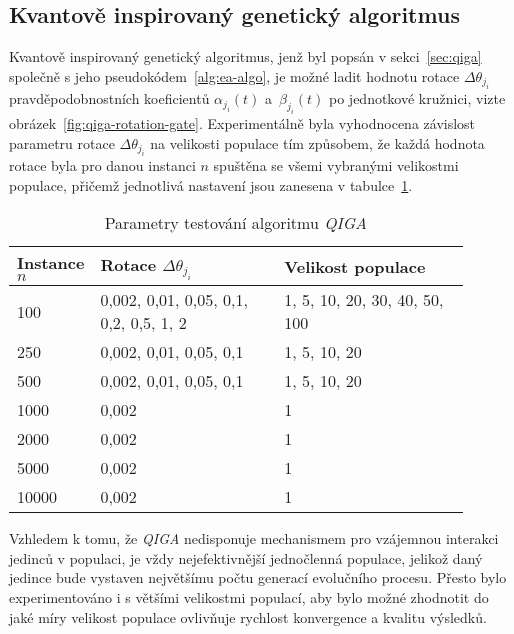 \subsection*{Kvantově inspirovaný genetický algoritmus}
Kvantově inspirovaný genetický algoritmus, jenž byl popsán v sekci~\ref{sec:qiga} společně s jeho pseudokódem~\ref{alg:ea-algo}, je možné ladit hodnotu rotace $\Delta\theta_{j_i}$ pravděpodobnostních koeficientů $\alpha_{j_i}\left(t\right)$ a~$\beta_{j_i}\left(t\right)$ po jednotkové kružnici, vizte obrázek~\ref{fig:qiga-rotation-gate}.
Experimentálně byla vyhodnocena závislost parametru rotace $\Delta\theta_{j_i}$ na velikosti populace tím způsobem, že každá hodnota rotace byla pro danou instanci $n$ spuštěna se všemi vybranými velikostmi populace, přičemž jednotlivá nastavení jsou zanesena v tabulce~\ref{tab:qiga-all-instance}.
\begin{table}[ht]
    \centering
    \begin{tabularx}{\linewidth}{@{} 
        l 
        p{0.45\linewidth} 
        p{0.45\linewidth} 
      @{}}
      \toprule
      \textbf{Instance $n$} & \textbf{Rotace $\Delta\theta_{j_i}$} & \textbf{Velikost populace} \\
      \midrule
      100  
        & 0,002, 0,01, 0,05, 0,1, 0,2, 0,5, 1, 2
        & 1, 5, 10, 20, 30, 40, 50, 100 \\[1ex]
      250  
        & 0,002, 0,01, 0,05, 0,1
        & 1, 5, 10, 20 \\[1ex]
      500  
        & 0,002, 0,01, 0,05, 0,1
        & 1, 5, 10, 20 \\[1ex]
      1000 
        & 0,002
        & 1 \\[1ex]
      2000 
        & 0,002
        & 1 \\[1ex]
      5000 
        & 0,002
        & 1 \\[1ex]
      10000 
        & 0,002
        & 1 \\
      \bottomrule
    \end{tabularx}
    \caption{Parametry testování algoritmu \emph{QIGA}}
    \label{tab:qiga-all-instance}
\end{table}
Vzhledem k tomu, že \emph{QIGA} nedisponuje mechanismem pro vzájemnou interakci jedinců v populaci, je vždy nejefektivnější jednočlenná populace, jelikož daný jedince bude vystaven největšímu počtu generací evolučního procesu. 
Přesto bylo experimentováno i s většími velikostmi populací, aby bylo možné zhodnotit do jaké míry velikost populace ovlivňuje rychlost konvergence a kvalitu výsledků.

